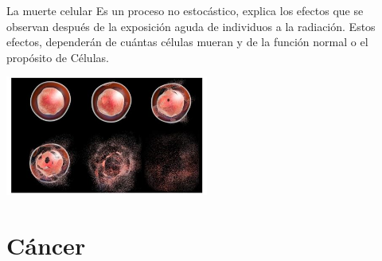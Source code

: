 \documentclass{beamer}
\begin{document}
\begin{frame}
   
   \begin{block}{La muerte celular}
     Es un proceso no estocástico, explica los efectos que se observan después de la exposición aguda de individuos a la radiación. Estos efectos, dependerán de cuántas células mueran y de la función normal o el propósito de Células.\\	
   \end{block}
   \begin{center}
   	\centering
   	\includegraphics[width=0.5\textwidth]{muerteCelular}
   \end{center}
   
\end{frame} 


\section{Cáncer}

\end{document}
